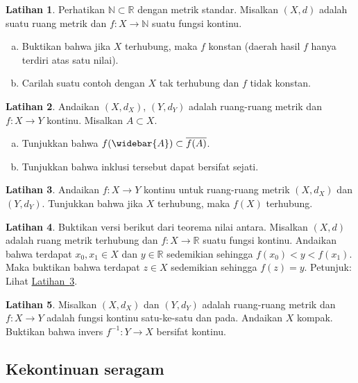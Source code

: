 \documentclass[12pt,openany]{book}
\newcommand{\R}{{\mathbb{R}}}
\newcommand{\N}{{\mathbb{N}}}
\theoremstyle{plain}
\theoremstyle{remark}
\theoremstyle{definition}
\newenvironment{exbox}{%
    \def\FrameCommand{\vrule width 1pt \relax\hspace{10pt}}%
    \MakeFramed{\advance\hsize-\width\FrameRestore}%
}{%
    \endMakeFramed
}
\newenvironment{exparts}{%
    \leavevmode\begin{enumerate}[a),noitemsep,topsep=0pt,parsep=0pt,partopsep=0pt]
}{%
    \end{enumerate}
}
\theoremstyle{exercise}
\newtheorem{exercise}{Latihan}[section]
\theoremstyle{example}
\newcommand{\exerciseref}[1]{\hyperref[#1]{Latihan~\ref*{#1}}}
\begin{document}
\begin{exbox}
\begin{exercise}
Perhatikan $\N \subset \R$ dengan metrik standar.  Misalkan $(X,d)$ adalah suatu
ruang metrik dan $f \colon X \to \N$ suatu fungsi kontinu.
\begin{exparts}
\item
Buktikan bahwa jika $X$ terhubung,
maka $f$ konstan (daerah hasil $f$ hanya terdiri atas satu nilai).
\item
Carilah suatu contoh dengan $X$ tak terhubung dan $f$ tidak konstan.
\end{exparts}
\end{exercise}

\begin{exercise} 
Andaikan $(X,d_X)$, $(Y,d_Y)$ adalah ruang-ruang metrik dan
$f \colon X \to Y$ kontinu.
Misalkan $A \subset X$.
\begin{exparts}
\item
Tunjukkan bahwa $f(\widebar{A}) \subset \overline{f(A)}$.
\item
Tunjukkan bahwa inklusi tersebut dapat bersifat sejati.
\end{exparts}
\end{exercise}

\begin{exercise} \label{exercise:msconnconn}
Andaikan $f \colon X \to Y$ kontinu untuk ruang-ruang metrik $(X,d_X)$
dan $(Y,d_Y)$.  Tunjukkan bahwa jika $X$ terhubung, maka $f(X)$ terhubung.
\end{exercise}

\begin{exercise}
Buktikan versi berikut dari
teorema nilai antara.  Misalkan $(X,d)$ adalah ruang metrik
terhubung dan $f \colon X \to \R$ suatu fungsi kontinu.  Andaikan bahwa
terdapat $x_0,x_1 \in X$ dan $y \in \R$ sedemikian sehingga $f(x_0) < y < f(x_1)$.
Maka buktikan bahwa terdapat $z \in X$ sedemikian sehingga $f(z) = y$.
Petunjuk: Lihat \exerciseref{exercise:msconnconn}.
\end{exercise}

\begin{exercise}
Misalkan $(X,d_X)$ dan $(Y,d_Y)$ adalah ruang-ruang metrik dan
$f \colon X \to Y$ adalah fungsi kontinu satu-ke-satu dan pada.  Andaikan
$X$ kompak.  Buktikan bahwa invers $f^{-1} \colon Y \to X$
bersifat kontinu.
\end{exercise}
\end{exbox}

\subsection{Kekontinuan seragam}
\end{document}
